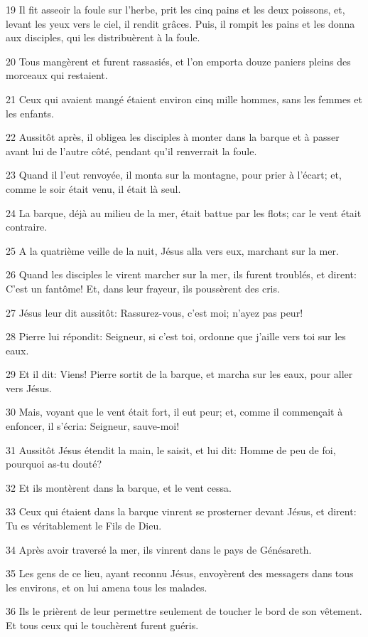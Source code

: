 \par 19 Il fit asseoir la foule sur l'herbe, prit les cinq pains et les deux poissons, et, levant les yeux vers le ciel, il rendit grâces. Puis, il rompit les pains et les donna aux disciples, qui les distribuèrent à la foule.
\par 20 Tous mangèrent et furent rassasiés, et l'on emporta douze paniers pleins des morceaux qui restaient.
\par 21 Ceux qui avaient mangé étaient environ cinq mille hommes, sans les femmes et les enfants.
\par 22 Aussitôt après, il obligea les disciples à monter dans la barque et à passer avant lui de l'autre côté, pendant qu'il renverrait la foule.
\par 23 Quand il l'eut renvoyée, il monta sur la montagne, pour prier à l'écart; et, comme le soir était venu, il était là seul.
\par 24 La barque, déjà au milieu de la mer, était battue par les flots; car le vent était contraire.
\par 25 A la quatrième veille de la nuit, Jésus alla vers eux, marchant sur la mer.
\par 26 Quand les disciples le virent marcher sur la mer, ils furent troublés, et dirent: C'est un fantôme! Et, dans leur frayeur, ils poussèrent des cris.
\par 27 Jésus leur dit aussitôt: Rassurez-vous, c'est moi; n'ayez pas peur!
\par 28 Pierre lui répondit: Seigneur, si c'est toi, ordonne que j'aille vers toi sur les eaux.
\par 29 Et il dit: Viens! Pierre sortit de la barque, et marcha sur les eaux, pour aller vers Jésus.
\par 30 Mais, voyant que le vent était fort, il eut peur; et, comme il commençait à enfoncer, il s'écria: Seigneur, sauve-moi!
\par 31 Aussitôt Jésus étendit la main, le saisit, et lui dit: Homme de peu de foi, pourquoi as-tu douté?
\par 32 Et ils montèrent dans la barque, et le vent cessa.
\par 33 Ceux qui étaient dans la barque vinrent se prosterner devant Jésus, et dirent: Tu es véritablement le Fils de Dieu.
\par 34 Après avoir traversé la mer, ils vinrent dans le pays de Génésareth.
\par 35 Les gens de ce lieu, ayant reconnu Jésus, envoyèrent des messagers dans tous les environs, et on lui amena tous les malades.
\par 36 Ils le prièrent de leur permettre seulement de toucher le bord de son vêtement. Et tous ceux qui le touchèrent furent guéris.


